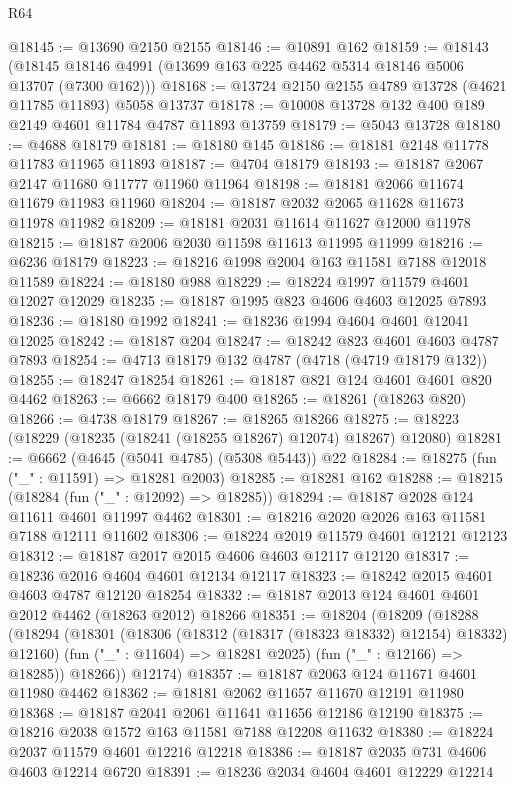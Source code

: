 \begin{lexlean}{R64}
\begin{coremodule}
@18145 := @13690 @2150 @2155
@18146 := @10891 @162
@18159 := @18143
    (@18145 @18146 @4991 (@13699 @163 @225 @4462 @5314 @18146 @5006 @13707 (@7300 @162)))
@18168 := @13724 @2150 @2155 @4789 @13728 (@4621 @11785 @11893) @5058 @13737
@18178 := @10008 @13728 @132 @400 @189 @2149 @4601 @11784 @4787 @11893 @13759
@18179 := @5043 @13728
@18180 := @4688 @18179
@18181 := @18180 @145
@18186 := @18181 @2148 @11778 @11783 @11965 @11893
@18187 := @4704 @18179
@18193 := @18187 @2067 @2147 @11680 @11777 @11960 @11964
@18198 := @18181 @2066 @11674 @11679 @11983 @11960
@18204 := @18187 @2032 @2065 @11628 @11673 @11978 @11982
@18209 := @18181 @2031 @11614 @11627 @12000 @11978
@18215 := @18187 @2006 @2030 @11598 @11613 @11995 @11999
@18216 := @6236 @18179
@18223 := @18216 @1998 @2004 @163 @11581 @7188 @12018 @11589
@18224 := @18180 @988
@18229 := @18224 @1997 @11579 @4601 @12027 @12029
@18235 := @18187 @1995 @823 @4606 @4603 @12025 @7893
@18236 := @18180 @1992
@18241 := @18236 @1994 @4604 @4601 @12041 @12025
@18242 := @18187 @204
@18247 := @18242 @823 @4601 @4603 @4787 @7893
@18254 := @4713 @18179 @132 @4787 (@4718 (@4719 @18179 @132))
@18255 := @18247 @18254
@18261 := @18187 @821 @124 @4601 @4601 @820 @4462
@18263 := @6662 @18179 @400
@18265 := @18261 (@18263 @820)
@18266 := @4738 @18179
@18267 := @18265 @18266
@18275 := @18223 (@18229 (@18235 (@18241 (@18255 @18267) @12074) @18267) @12080)
@18281 := @6662 (@4645 (@5041 @4785) (@5308 @5443)) @22
@18284 := @18275 (fun ("_" : @11591) => @18281 @2003)
@18285 := @18281 @162
@18288 := @18215 (@18284 (fun ("_" : @12092) => @18285))
@18294 := @18187 @2028 @124 @11611 @4601 @11997 @4462
@18301 := @18216 @2020 @2026 @163 @11581 @7188 @12111 @11602
@18306 := @18224 @2019 @11579 @4601 @12121 @12123
@18312 := @18187 @2017 @2015 @4606 @4603 @12117 @12120
@18317 := @18236 @2016 @4604 @4601 @12134 @12117
@18323 := @18242 @2015 @4601 @4603 @4787 @12120 @18254
@18332 := @18187 @2013 @124 @4601 @4601 @2012 @4462 (@18263 @2012) @18266
@18351 := @18204
    (@18209
      (@18288
        (@18294
          (@18301
            (@18306 (@18312 (@18317 (@18323 @18332) @12154) @18332) @12160)
            (fun ("_" : @11604) => @18281 @2025)
            (fun ("_" : @12166) => @18285))
          @18266))
      @12174)
@18357 := @18187 @2063 @124 @11671 @4601 @11980 @4462
@18362 := @18181 @2062 @11657 @11670 @12191 @11980
@18368 := @18187 @2041 @2061 @11641 @11656 @12186 @12190
@18375 := @18216 @2038 @1572 @163 @11581 @7188 @12208 @11632
@18380 := @18224 @2037 @11579 @4601 @12216 @12218
@18386 := @18187 @2035 @731 @4606 @4603 @12214 @6720
@18391 := @18236 @2034 @4604 @4601 @12229 @12214

\end{coremodule}
\end{lexlean}
